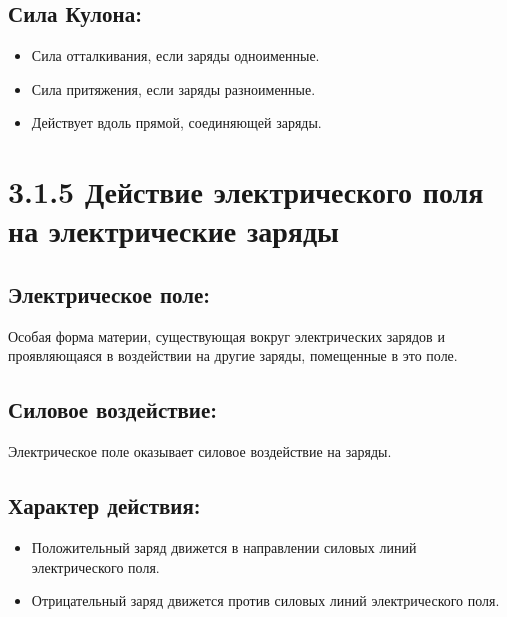\documentclass[a4paper,12pt]{article}
\begin{document}
\vspace{-9pt}
\subsection*{Сила Кулона:}
\vspace{-3pt}
\begin{itemize}
    \item Сила отталкивания, если заряды одноименные.
    \item Сила притяжения, если заряды разноименные.
    \item Действует вдоль прямой, соединяющей заряды.
\end{itemize}


\newpage
\section*{3.1.5 Действие электрического поля на электрические заряды}

\vspace{-9pt}
\subsection*{Электрическое поле:}
\vspace{-3pt}
Особая форма материи, существующая вокруг электрических зарядов и проявляющаяся в воздействии на другие заряды, помещенные в это поле.


\vspace{-9pt}
\subsection*{Силовое воздействие:}
\vspace{-3pt}
Электрическое поле оказывает силовое воздействие на заряды.

\vspace{-9pt}
\subsection*{Характер действия:}
\vspace{-3pt}
\begin{itemize}
    \item Положительный заряд движется в направлении силовых линий электрического поля.
    \item Отрицательный заряд движется против силовых линий электрического поля.
\end{itemize}

\vspace{-9pt}
\end{document}
